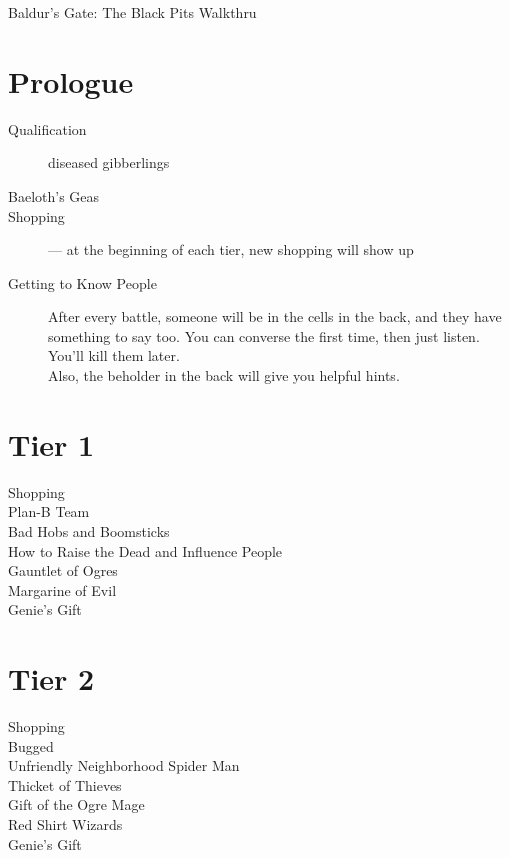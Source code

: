 \documentclass[10pt,a4,twoside]{article}
\begin{document}
\begin{titlepage}
\begin{center}
{\Huge Baldur's Gate: The Black Pits Walkthru}
\end{center}
\section*{Prologue}
\begin{description}
 \item [Qualification] diseased gibberlings
 \item [Baeloth's Geas]
 \item [Shopping] --- at the beginning of each tier, new shopping will show up
 \item [Getting to Know People] After every battle, someone will be in the cells in the back, and they have something to say too. You can converse the first time, then just listen. You'll kill them later. \\Also, the beholder in the back will give you helpful hints. 
\end{description}

\section*{Tier 1}
\begin{description}
 \item[Shopping]
 \item[Plan-B Team]
 \item[Bad Hobs and Boomsticks]
 \item[How to Raise the Dead and Influence People]
 \item[Gauntlet of Ogres]
 \item[Margarine of Evil]
 \item[Genie's Gift]
\end{description}

\section*{Tier 2}
\begin{description}
 \item[Shopping]
 \item[Bugged]
 \item[Unfriendly Neighborhood Spider Man]
 \item[Thicket of Thieves]
 \item[Gift of the Ogre Mage]
 \item[Red Shirt Wizards]
 \item[Genie's Gift]
\end{description}


\end{titlepage}
\end{document}
